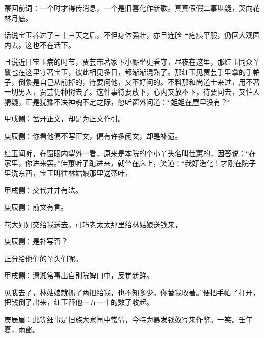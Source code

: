 \begin{parag}
    \begin{note}蒙回前词：一个时才得传消息，一个是旧喜化作新歌。真真假假二事堪疑，哭向花林月底。\end{note}
\end{parag}


\begin{parag}
    话说宝玉养过了三十三天之后，不但身体强壮，亦且连脸上疮痕平服，仍回大观园内去。这也不在话下。
\end{parag}


\begin{parag}
    且说近日宝玉病的时节，贾芸带著家下小厮坐更看守，昼夜在这里，那红玉同众丫鬟也在这里守著宝玉，彼此相见多日，都渐渐混熟了。那红玉见贾芸手里拿的手帕子，倒象是自己从前掉的，待要问他，又不好问的。不料那和尚道士来过，用不著一切男人，贾芸仍种树去了。这件事待要放下，心内又放不下，待要问去，又怕人猜疑，正是犹豫不决神魂不定之际，忽听窗外问道：“姐姐在屋里没有？”\begin{note}甲戌侧：岔开正文，却是为正文作引。\end{note}\begin{note}庚辰侧：你看他偏不写正文，偏有许多闲文，却是补遗。\end{note}红玉闻听，在窗眼内望外一看，原来是本院的个小丫头名叫佳蕙的，因答说：“在家里，你进来罢。”佳蕙听了跑进来，就坐在床上，笑道：“我好造化！才刚在院子里洗东西，宝玉叫往林姑娘那里送茶叶，\begin{note}甲戌侧：交代井井有法。\end{note}\begin{note}庚辰侧：前文有言。\end{note}花大姐姐交给我送去。可巧老太太那里给林姑娘送钱来，\begin{note}庚辰侧：是补写否？\end{note}正分给他们的丫头们呢。\begin{note}甲戌侧：潇湘常事出自别院婢口中，反觉新鲜。\end{note}见我去了，林姑娘就抓了两把给我，也不知多少。你替我收著。”便把手帕子打开，把钱倒了出来，红玉替他一五一十的数了收起。\begin{note}庚辰眉：此等细事是旧族大家闺中常情，今特为暴发钱奴写来作鉴。一笑。壬午夏，雨窗。\end{note}
\end{parag}


